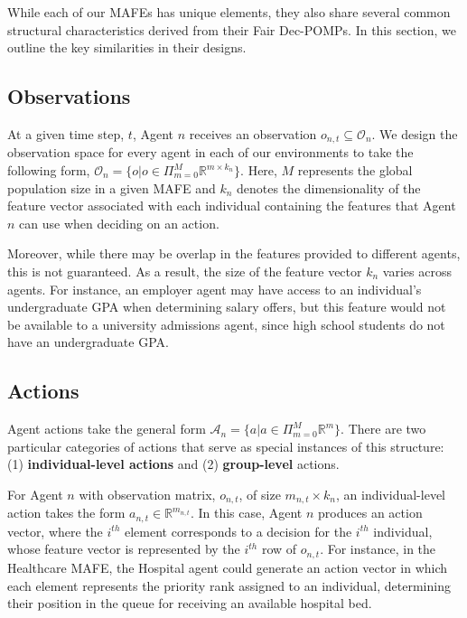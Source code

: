 \label{sec::general_MAFE}

While each of our MAFEs has unique elements, they also share several common structural characteristics derived from their Fair Dec-POMPs. In this section, we outline the key similarities in their designs.

\subsection{Observations}

At a given time step, $t$, Agent $n$ receives an observation $o_{n,t} \subseteq \mathcal{O}_n$. We design the observation space for every agent in each of our environments to take the following form, $\mathcal{O}_n = \{o | o \in \Pi_{m=0}^M \mathbb{R}^{m\times k_n}\}$. Here, $M$ represents the global population size in a given MAFE and $k_n$ denotes the dimensionality of the feature vector associated with each individual containing the features that Agent $n$ can use when deciding on an action.

Moreover, while there may be overlap in the features provided to different agents, this is not guaranteed. As a result, the size of the feature vector $k_n$ varies across agents. For instance, an employer agent may have access to an individual’s undergraduate GPA when determining salary offers, but this feature would not be available to a university admissions agent, since high school students do not have an undergraduate GPA.

\subsection{Actions}

Agent actions take the general form $\mathcal{A}_n = \{a | a \in \Pi_{m=0}^M \mathbb{R}^{m}\}$. There are two particular categories of actions that serve as special instances of this structure: (1) \textbf{individual-level actions} and (2) \textbf{group-level} actions. 

For Agent $n$ with observation matrix, $o_{n,t}$, of size $m_{n,t}\times k_n$, an individual-level action takes the form $a_{n,t}\in\mathbb{R}^{m_{n,t}}$. In this case, Agent $n$ produces an action vector, where the $i^{th}$ element corresponds to a decision for the $i^{th}$ individual, whose feature vector is represented by the $i^{th}$ row of $o_{n,t}$. For instance, in the Healthcare MAFE, the Hospital agent could generate an action vector in which each element represents the priority rank assigned to an individual, determining their position in the queue for receiving an available hospital bed.


